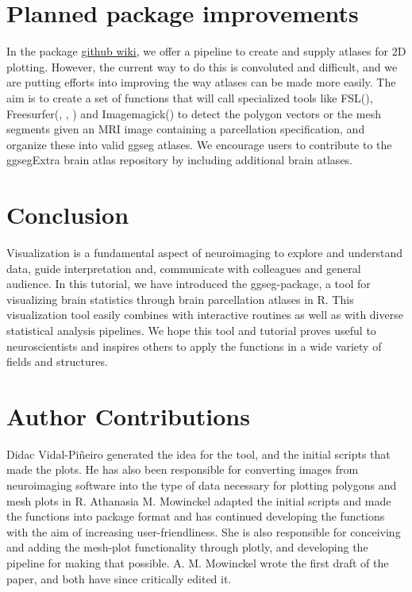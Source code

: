 \documentclass[fleqn,10pt]{wlpeerj} %
\begin{document}
\hypertarget{planned-package-improvements}{%
\section{Planned package improvements}\label{planned-package-improvements}}

In the package \href{https://github.com/LCBC-UiO/ggseg/wiki}{github wiki}, we offer a pipeline to create and supply atlases for 2D plotting.
However, the current way to do this is convoluted and difficult, and we are putting efforts into improving the way atlases can be made more easily.
The aim is to create a set of functions that will call specialized tools like FSL(\citet{fsl}), Freesurfer(\citet{fischl_99}, \citet{dale_99}, \citet{Fischl2000}) and Imagemagick(\citet{magick}) to detect the polygon vectors or the mesh segments given an MRI image containing a parcellation specification, and organize these into valid ggseg atlases.
We encourage users to contribute to the ggsegExtra brain atlas repository by including additional brain atlases.

\hypertarget{conclusion}{%
\section{Conclusion}\label{conclusion}}

Visualization is a fundamental aspect of neuroimaging to explore and understand data, guide interpretation and, communicate with colleagues and general audience.
In this tutorial, we have introduced the ggseg-package, a tool for visualizing brain statistics through brain parcellation atlases in R.
This visualization tool easily combines with interactive routines as well as with diverse statistical analysis pipelines.
We hope this tool and tutorial proves useful to neuroscientists and inspires others to apply the functions in a wide variety of fields and structures.

\hypertarget{author-contributions}{%
\section{Author Contributions}\label{author-contributions}}

Didac Vidal-Piñeiro generated the idea for the tool, and the initial scripts that made the plots.
He has also been responsible for converting images from neuroimaging software into the type of data necessary for plotting polygons and mesh plots in R.
Athanasia M. Mowinckel adapted the initial scripts and made the functions into package format and has continued developing the functions with the aim of increasing user-friendliness.
She is also responsible for conceiving and adding the mesh-plot functionality through plotly, and developing the pipeline for making that possible.
A. M. Mowinckel wrote the first draft of the paper, and both have since critically edited it.
\end{document}
